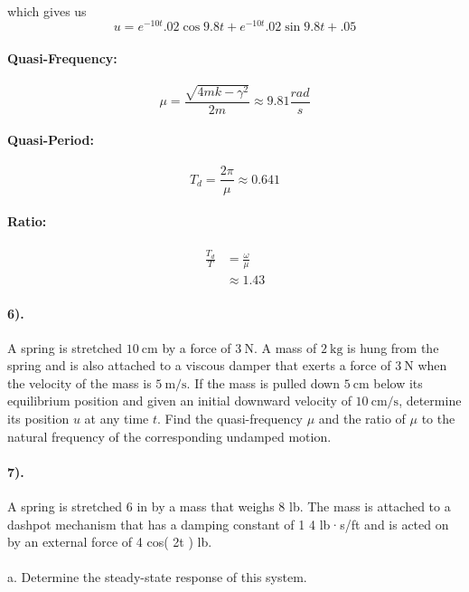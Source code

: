 \documentclass{article}
\begin{document}
\paragraph{}which gives us 
\[
    u = e^{-10t}.02 \cos9.8t + e^{-10t} .02\sin 9.8t + .05
\]
\paragraph{Quasi-Frequency:}
\[
    \mu = \frac{\sqrt{4mk-\gamma^2}}{2m} \approx 9.81 \frac{rad}{s}
\]
\paragraph{Quasi-Period:}
\[
    T_d = \frac{2\pi}{\mu} \approx 0.641
\]
\paragraph{Ratio:}
\begin{align*}
    \frac{T_d}{T} &= \frac{\omega}{\mu}\\
                  &\approx 1.43
\end{align*}

\paragraph{6).} A spring is stretched $10 \mathrm{~cm}$ by a force of $3 \mathrm{~N}$. A
mass of $2 \mathrm{~kg}$ is hung from the spring and is also attached to a
viscous damper that exerts a force of $3 \mathrm{~N}$ when the velocity of the
mass is $5 \mathrm{~m} / \mathrm{s}$. If the mass is pulled down $5
\mathrm{~cm}$ below its equilibrium position and given an initial downward
velocity of $10 \mathrm{~cm} / \mathrm{s}$, determine its position $u$ at any
time $t$. Find the quasi-frequency $\mu$ and the ratio of $\mu$ to the natural
frequency of the corresponding undamped motion.

\paragraph{7).} A spring is stretched 6 in by a mass that weighs 8 lb. The mass
is attached to a dashpot mechanism that has a damping constant of 1
4 lb·s/ft and is acted on by an external force of 4 cos( 2t ) lb.
\paragraph{}a. Determine the steady-state response of this system.
\end{document}
